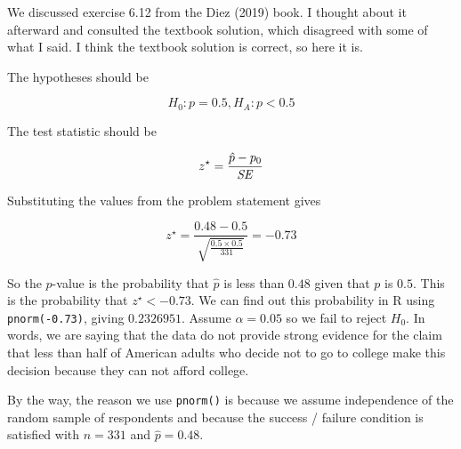 
\begin{center}

  \textsf{\MakeUppercase{}}

\smallskip

\textsf{\MakeUppercase{}}

\smallskip

\textsf{\MakeUppercase{}}

\end{center}


We discussed exercise 6.12 from the Diez (2019) book. I thought about it
afterward and consulted the textbook solution, which disagreed with some
of what I said. I think the textbook solution is correct, so here it is.

The hypotheses should be

\[
H_0: p = 0.5,
H_A: p < 0.5
\]

The test statistic should be

\[
z^{\star}= \frac{\hat{p} - p_0}{\text{\textit{SE}}}
\]

Substituting the values from the problem statement gives

\[
z^{\star}= \frac{0.48 - 0.5}{\sqrt{\frac{0.5\times 0.5}{331}}} = -0.73
\]

So the \(p\)-value is the probability that \(\hat{p}\) is less than
\(0.48\) given that \(p\) is \(0.5\). This is the probability that
\(z^{\star} < -0.73\). We can find out this probability in R using
\texttt{pnorm(-0.73)}, giving \(0.2326951\). Assume \(\alpha = 0.05\) so
we fail to reject \(H_0\). In words, we are saying that the data do not
provide strong evidence for the claim that less than half of American
adults who decide not to go to college make this decision because they
can not afford college.

By the way, the reason we use \texttt{pnorm()} is because we assume
independence of the random sample of respondents and because the success
/ failure condition is satisfied with \(n=331\) and \(\hat{p}=0.48\).
